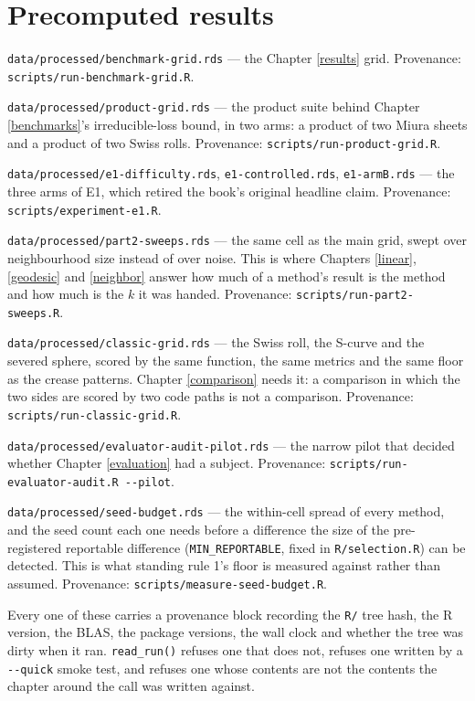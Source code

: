 \documentclass[
  british,
  a4paper,
]{book}
\begin{document}
\section*{Precomputed results}\label{datasets-precomputed}

\texttt{data/processed/benchmark-grid.rds} --- the Chapter \ref{results} grid.
Provenance: \texttt{scripts/run-benchmark-grid.R}.

\texttt{data/processed/product-grid.rds} --- the product suite behind Chapter
\ref{benchmarks}'s irreducible-loss bound, in two arms: a product of two Miura
sheets and a product of two Swiss rolls. Provenance:
\texttt{scripts/run-product-grid.R}.

\texttt{data/processed/e1-difficulty.rds}, \texttt{e1-controlled.rds}, \texttt{e1-armB.rds} --- the
three arms of E1, which retired the book's original headline claim. Provenance:
\texttt{scripts/experiment-e1.R}.

\texttt{data/processed/part2-sweeps.rds} --- the same cell as the main grid, swept over
neighbourhood size instead of over noise. This is where Chapters
\ref{linear}, \ref{geodesic} and \ref{neighbor} answer how much of a
method's result is the method and how much is the \(k\) it was handed. Provenance:
\texttt{scripts/run-part2-sweeps.R}.

\texttt{data/processed/classic-grid.rds} --- the Swiss roll, the S-curve and the severed
sphere, scored by the same function, the same metrics and the same floor as the
crease patterns. Chapter \ref{comparison} needs it: a comparison in which the
two sides are scored by two code paths is not a comparison. Provenance:
\texttt{scripts/run-classic-grid.R}.

\texttt{data/processed/evaluator-audit-pilot.rds} --- the narrow pilot that decided
whether Chapter \ref{evaluation} had a subject. Provenance:
\texttt{scripts/run-evaluator-audit.R\ -\/-pilot}.

\texttt{data/processed/seed-budget.rds} --- the within-cell spread of every method, and
the seed count each one needs before a difference the size of the pre-registered
reportable difference (\texttt{MIN\_REPORTABLE}, fixed in \texttt{R/selection.R}) can be
detected. This is what standing rule 1's floor is measured against rather than
assumed. Provenance: \texttt{scripts/measure-seed-budget.R}.

Every one of these carries a provenance block recording the \texttt{R/} tree hash, the
R version, the BLAS, the package versions, the wall clock and whether the tree
was dirty when it ran. \texttt{read\_run()} refuses one that does not, refuses one
written by a \texttt{-\/-quick} smoke test, and refuses one whose contents are not the
contents the chapter around the call was written against.
\end{document}
